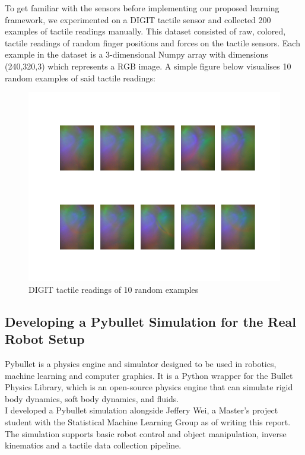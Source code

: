 \documentclass[a4paper]{report}
\theoremstyle{definition}
\begin{document}
To get familiar with the sensors before implementing our proposed learning framework, we experimented on a DIGIT tactile sensor and collected 200 examples of tactile readings manually. This dataset consisted of raw, colored, tactile readings of random finger positions and forces on the tactile sensors. Each example in the dataset is a 3-dimensional Numpy array with dimensions (240,320,3) which represents a RGB image. A simple figure below visualises 10 random examples of said tactile readings:
\begin{figure}[H]
    \centering
    \includegraphics[scale=0.4]{docs/Project Report/Media/digit_frames.png}
    \caption{DIGIT tactile readings of 10 random examples}
    \label{fig:digit\_readings}
\end{figure}

\subsection{Developing a Pybullet Simulation for the Real Robot Setup}
Pybullet \cite{pybullet} is a physics engine and simulator designed to be used in robotics, machine learning and computer graphics. It is a Python wrapper for the Bullet Physics Library, which is an open-source physics engine that can simulate rigid body dynamics, soft body dynamics, and fluids.\\

I developed a Pybullet simulation alongside Jeffery Wei, a Master's project student with the Statistical Machine Learning Group as of writing this report. The simulation supports basic robot control and object manipulation, inverse kinematics and a tactile data collection pipeline.
\end{document}

